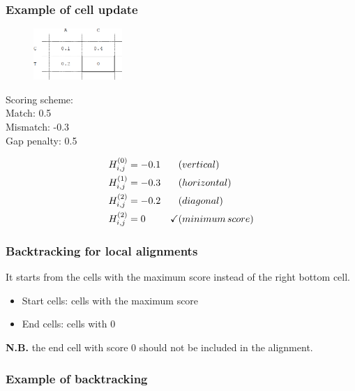 \subsubsection*{Example of cell update}
\begin{multicols}{2}
\begin{figure}[H]
  \centering
      \includegraphics[width=0.3\textwidth]{fig04/local_alignment_cell_update.png}
\end{figure}

\noindent Scoring scheme: \\ 
\null \quad Match: 0.5 \\ 
\null \quad Mismatch: -0.3 \\ 
\null \quad Gap penalty: 0.5

\end{multicols} 

\begin{align*}
H_{i,j}^{(0)} &=  -0.1 &\hfill &(vertical) \\
H_{i,j}^{(1)} &= -0.3 &\hfill &(horizontal) \\
H_{i,j}^{(2)} &= -0.2 &\hfill &(diagonal) \\
H_{i,j}^{(2)} &= 0 & \checkmark &(minimum \, score)
\end{align*}
\medskip 

%
%
\subsubsection*{Backtracking for local alignments}
It starts from the cells with the maximum score instead of the right bottom cell.

\begin{itemize}
\item Start cells: cells with the maximum score 
\item End cells: cells with 0
\end{itemize}

\noindent
\textbf{N.B.} the end cell with score 0 should not be included in the alignment.

%
%
\subsubsection*{Example of backtracking}

